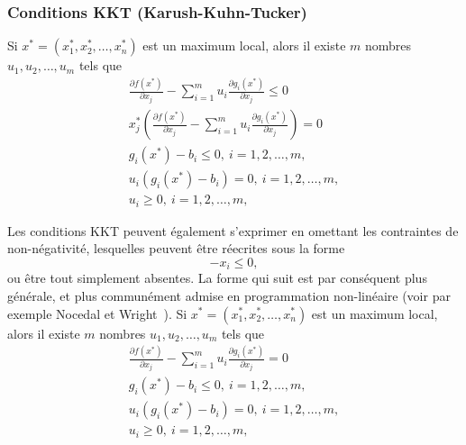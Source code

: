 \subsubsection{Conditions KKT (Karush-Kuhn-Tucker)}

Si $x^* = (x_1^*, x_2^*,\ldots, x_n^*)$ est un maximum local, alors il existe $m$ nombres $u_1, u_2,\ldots, u_m$ tels que
\begin{align*}
\frac{\partial f(x^*)}{\partial x_j} -\sum_{i=1}^m u_i \frac{\partial g_i(x^*)}{\partial x_j} \leq 0 \\
x_j^* \left( \frac{\partial f(x^*)}{\partial x_j} -\sum_{i=1}^m u_i \frac{\partial g_i(x^*)}{\partial x_j} \right) = 0 \\
g_i(x^*) - b_i \leq 0,\ i = 1,2,\ldots,m, \\
u_i \left( g_i(x^*) - b_i \right) = 0,\ i = 1,2,\ldots,m, \\
u_i \geq 0,\ i = 1,2,\ldots,m, 
\end{align*}

Les conditions KKT peuvent également s'exprimer en omettant les contraintes de non-négativité, lesquelles peuvent être réecrites sous la forme
\[
-x_i \leq 0,
\]
ou être tout simplement absentes.
La forme qui suit est par conséquent plus générale, et plus communément admise en programmation non-linéaire (voir par exemple Nocedal et Wright~\cite{NoceWrig99}).
Si $x^* = (x_1^*, x_2^*,\ldots, x_n^*)$ est un maximum local, alors il existe $m$ nombres $u_1, u_2,\ldots, u_m$ tels que
\begin{align*}
\frac{\partial f(x^*)}{\partial x_j} -\sum_{i=1}^m u_i \frac{\partial g_i(x^*)}{\partial x_j} = 0 \\
g_i(x^*) - b_i \leq 0,\ i = 1,2,\ldots,m, \\
u_i \left( g_i(x^*) - b_i \right) = 0,\ i = 1,2,\ldots,m, \\
u_i \geq 0,\ i = 1,2,\ldots,m, 
\end{align*}

